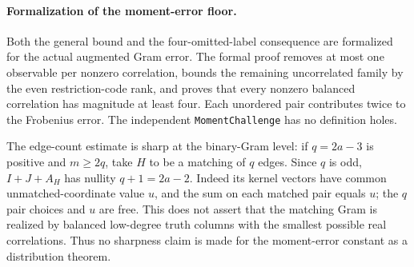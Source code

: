 \paragraph{Formalization of the moment-error floor.}
Both the general bound and the four-omitted-label consequence are
formalized for the actual augmented Gram error. The formal proof removes
at most one observable per nonzero correlation, bounds the remaining
uncorrelated family by the even restriction-code rank, and proves that
every nonzero balanced correlation has magnitude at least four.
Each unordered pair contributes twice to the Frobenius error.
The independent \texttt{MomentChallenge} has no definition holes.

The edge-count estimate is sharp at the binary-Gram level: if
$q=2a-3$ is positive and $m\ge2q$, take $H$ to be a matching of $q$
edges. Since $q$ is odd, $I+J+A_H$ has nullity $q+1=2a-2$.
Indeed its kernel vectors have common unmatched-coordinate value $u$,
and the sum on each matched pair equals $u$; the $q$ pair choices and
$u$ are free. This does not assert that the matching Gram is realized
by balanced low-degree truth columns with the smallest possible real
correlations. Thus no sharpness claim is made for the moment-error
constant as a distribution theorem.

